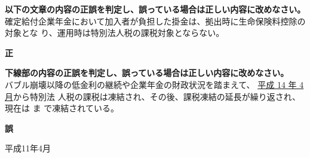 \begin{truefalse}[年金1 2018 問題2(3)\textcircled{2}]
      \textbf{以下の文章の内容の正誤を判定し、誤っている場合は正しい内容に改めなさい。}
\\  

確定給付企業年金において加入者が負担した掛金は、拠出時に生命保険料控除の対象とな
り、運用時は特別法人税の課税対象とならない。
\end{truefalse}

\begin{answerbox}
  \textbf{正}
\end{answerbox}

\begin{truefalse}[年金1 H29 問題1(6)\textcircled{1}（改題）]
      \textbf{下線部の内容の正誤を判定し、誤っている場合は正しい内容に改めなさい。}
\\  

バブル崩壊以降の低金利の継続や企業年金の財政状況を踏まえて、 \underline{平成 14 年 4 月}から特別法
人税の課税は凍結され、その後、課税凍結の延長が繰り返され、現在は \TouketsuDate ま
で凍結されている。
\end{truefalse}

\begin{answerbox}
  \textbf{誤}

  平成11年4月
\end{answerbox}

\newpage